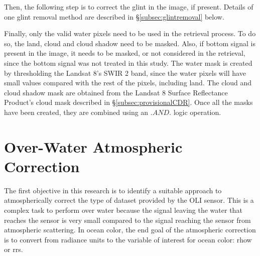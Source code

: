 Then, the following step is to correct the glint in the image, if present. Details of one glint removal method are described in \S\ref{subsec:glintremoval} below.

Finally, only the valid water pixels need to be used in the retrieval process. To do so, the land, cloud and cloud shadow need to be masked. Also, if bottom signal is present in the image, it needs to be masked, or not considered in the retrieval, since the bottom signal was not treated in this study. The water mask is created by thresholding the Landsat 8's SWIR 2 band, since the water pixels will have small values compared with the rest of the pixels, including land. The cloud and cloud shadow mask are obtained from the Landsat 8 Surface Reflectance Product's \citep{L8SurfProduct2015} cloud mask described in \S\ref{subsec:provisionalCDR}. Once all the masks have been created, they are combined using an $.AND.$ logic operation.

\section{Over-Water Atmospheric Correction} 
\label{sec:atmcorr}
The first objective in this research is to identify a suitable approach to atmospherically correct the type of dataset provided by the OLI sensor. This is a complex task to perform over water because the signal leaving the water that reaches the sensor is very small compared to the signal reaching the sensor from atmospheric scattering. In ocean color, the end goal of the atmospheric correction is to convert from radiance units to the variable of interest for ocean color: \acrfull{rhow} or \acrfull{rrs}.

